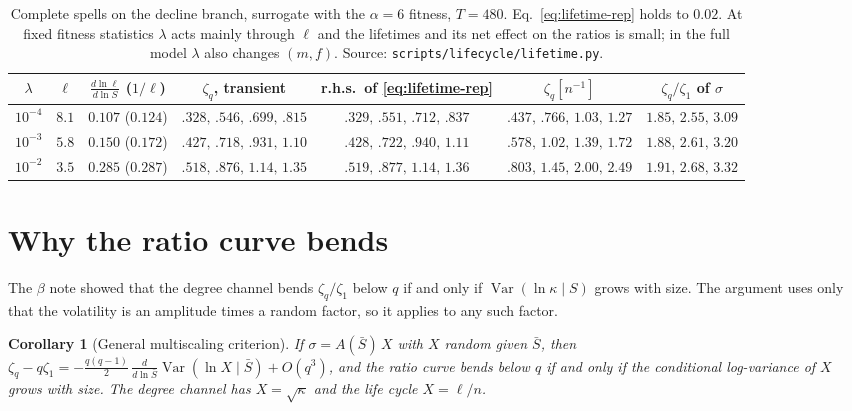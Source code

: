 \documentclass[11pt]{article}
\newcommand{\Var}{\operatorname{Var}}
\newtheorem{corollary}{Corollary}
\theoremstyle{remark}
\begin{document}
\begin{table}[h]
\centering\footnotesize\setlength{\tabcolsep}{2.5pt}
\begin{tabular}{c|cc|c|c|c|c}
\toprule
$\lambda$ & $\ell$ & $\frac{d\ln\ell}{d\ln S}$ ($1/\ell$) & $\zeta_q$, transient & r.h.s.\ of \eqref{eq:lifetime-rep}
 & $\zeta_q[n^{-1}]$ & $\zeta_q/\zeta_1$ of $\sigma$\\
\midrule
$10^{-4}$ & $8.1$ & $0.107$ ($0.124$) & $.328,\,.546,\,.699,\,.815$ & $.329,\,.551,\,.712,\,.837$ & $.437,\,.766,\,1.03,\,1.27$ & $1.85,\,2.55,\,3.09$\\
$10^{-3}$ & $5.8$ & $0.150$ ($0.172$) & $.427,\,.718,\,.931,\,1.10$ & $.428,\,.722,\,.940,\,1.11$ & $.578,\,1.02,\,1.39,\,1.72$ & $1.88,\,2.61,\,3.20$\\
$10^{-2}$ & $3.5$ & $0.285$ ($0.287$) & $.518,\,.876,\,1.14,\,1.35$ & $.519,\,.877,\,1.14,\,1.36$ & $.803,\,1.45,\,2.00,\,2.49$ & $1.91,\,2.68,\,3.32$\\
\bottomrule
\end{tabular}
\caption{Complete spells on the decline branch, surrogate with the $\alpha=6$ fitness, $T=480$.
Eq.~\eqref{eq:lifetime-rep} holds to $0.02$.  At fixed fitness statistics $\lambda$ acts mainly through $\ell$ and
the lifetimes and its net effect on the ratios is small; in the full model $\lambda$ also changes $(m,f)$.
Source: \texttt{scripts/lifecycle/lifetime.py}.}
\label{tab:lifetime}
\end{table}

\section{Why the ratio curve bends}

The $\beta$ note showed that the degree channel bends $\zeta_q/\zeta_1$ below $q$ if and only if
$\Var(\ln\kappa\mid S)$ grows with size.  The argument uses only that the volatility is an amplitude times a random
factor, so it applies to any such factor.

\begin{corollary}[General multiscaling criterion]\label{cor:criterion}
If $\sigma=A(\bar S)\,X$ with $X$ random given $\bar S$, then
$\zeta_q-q\zeta_1=-\tfrac{q(q-1)}{2}\,\frac{d}{d\ln\bar S}\Var(\ln X\mid\bar S)+O(q^3)$, and the ratio curve
bends below $q$ if and only if the conditional log-variance of $X$ grows with size.  The degree channel has
$X=\sqrt\kappa$ and the life cycle $X=\ell/n$.
\end{corollary}
\end{document}
